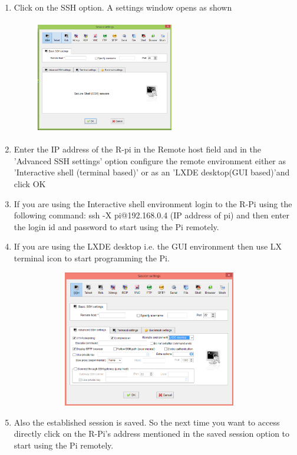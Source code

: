 \documentclass[11pt,a4paper]{article}
\begin{document}
\begin{enumerate}
\begin{figure}[h!]
			\centering
		\end{figure}
		\newpage
		\item Click on the SSH option. A settings window opens as shown
		\begin{figure}[h!]
			\includegraphics[width=6cm,height=5cm]{M3.PNG}
			\centering
		\end{figure}
		\item Enter the IP address of the R-pi in the Remote host field and in the 'Advanced SSH settings' option configure the remote environment either as 'Interactive shell (terminal based)' or as an 'LXDE desktop(GUI based)'and click OK
		\item If you are using the Interactive shell environment login to the R-Pi using the following command: ssh -X pi@192.168.0.4 (IP address of pi) and then enter the login id and password to start using the Pi remotely.
		\item If you are using the LXDE desktop i.e. the GUI environment then use LX terminal icon to start programming the Pi.
		\begin{figure}[h]
			\includegraphics[width=10cm,height=6cm]{M4.PNG}
			\centering
		\end{figure}
		\newpage
		\item Also the established session is saved. So the next time you want to access directly click on the R-Pi's address mentioned in the saved session option to start using the Pi remotely.
		\begin{figure}[h!]

\end{figure}
\end{enumerate}
\end{document}
